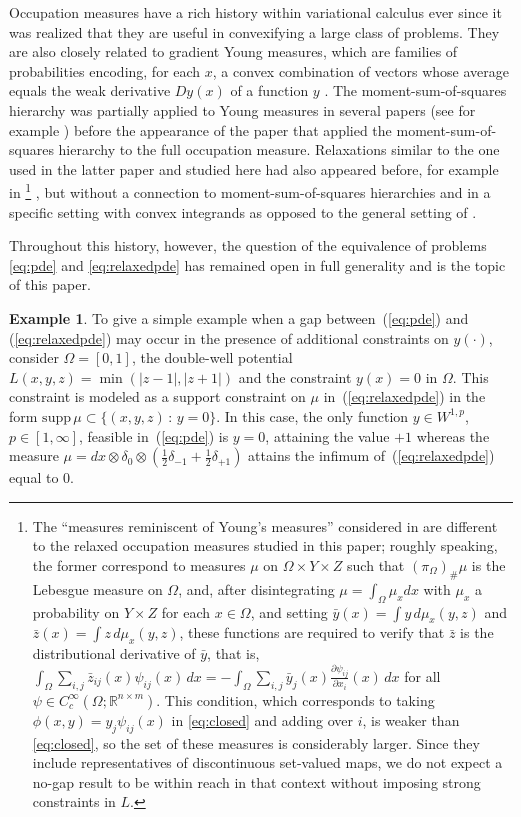 \documentclass{article}
\newcommand{\R}{\mathbb{R}}
\theoremstyle{definition}
\newtheorem{example}[theorem]{Example}
\theoremstyle{remark}
\newcommand{\proj}{\pi}
\newcommand{\projX}{\proj_{\Omega}}
\begin{document}
 Occupation measures have a rich history within variational calculus ever since it was realized that they are useful in convexifying a large class of problems. %
 They are also closely related to gradient Young measures, which are families of probabilities encoding, for each $x$, a convex combination of vectors whose average equals the weak derivative $Dy(x)$ of a function $y$%
 . The moment-sum-of-squares hierarchy was partially applied to Young measures in several papers (see for example \cite{meziat2005analysis,meziat2008exact,meziat2010coarse}) before the appearance of the paper \cite{korda2018moments} that applied the moment-sum-of-squares hierarchy to the full occupation measure. Relaxations similar to the one used in the latter paper and studied here had also appeared before, for example in \cite{awi2014polyconvex}%
 \footnote{The ``measures reminiscent of Young's measures'' considered in \cite{awi2014polyconvex} are different to the relaxed occupation measures studied in this paper; roughly speaking, the former correspond to measures $\mu$ on $\Omega\times Y\times Z$ such that $(\projX)_{\#}\mu$ is 
the Lebesgue measure on $\Omega$, and, after disintegrating $\mu=\int_{\Omega}\mu_xdx$ with $\mu_x$ a probability on $Y\times Z$ for each $x\in\Omega$, and setting $\bar y(x)=\int y\,d\mu_x(y,z)$ and $\bar z(x)=\int z\,d\mu_x(y,z)$, these functions are required to verify that $\bar z$ is the distributional derivative of $\bar y$, that is, $\int_{\Omega}\sum_{i,j}\bar z_{ij}(x)\psi_{ij}(x)\,dx=-\int_{\Omega}\sum_{i,j}\bar y_j(x)\frac{\partial\psi_{ij}}{\partial x_i}(x)\,dx$ for all $\psi\in C^\infty_c(\Omega;\R^{n\times m})$. This condition, which corresponds to taking $\phi(x,y)=y_j\psi_{ij}(x)$ in \eqref{eq:closed} and adding over $i$, is weaker than \eqref{eq:closed}, so the set of these measures is considerably larger. Since they include representatives of discontinuous set-valued maps, we do not expect a no-gap result to be within reach in that context without imposing strong constraints in $L$.}%
 , but without a connection to moment-sum-of-squares hierarchies and in a specific setting with convex integrands as opposed to the general setting of 
 \cite{korda2018moments}. 

Throughout this history, however, the question of the equivalence of problems \eqref{eq:pde} and \eqref{eq:relaxedpde} has remained open in full generality and is the topic of this paper. 

\begin{example}\label{ex:doublewell} 
To give a simple %
%
example when a gap between~(\ref{eq:pde}) and (\ref{eq:relaxedpde}) may occur in the presence of additional constraints on $y(\cdot)$, consider $\Omega = [0,1]$, the double-well potential $L(x,y,z) = \min(|z-1|,|z+1|)$ and the constraint $y(x) = 0$ in $\Omega$. This constraint is modeled as a support constraint on $\mu$ in~(\ref{eq:relaxedpde}) in the form $\mathrm{supp}\,\mu \subset \{(x,y,z)\,:\, y = 0\}$. In this case, the only function $y \in W^{1,p}$, $p\in[1,\infty]$, feasible in~(\ref{eq:pde}) is $y = 0$, attaining the value $+1$ whereas the measure $\mu = dx\otimes \delta_0 \otimes (\frac{1}{2}\delta_{-1} + \frac{1}{2}\delta_{+1})$ attains the infimum of~(\ref{eq:relaxedpde}) equal to 0. 
\end{example}
\end{document}
